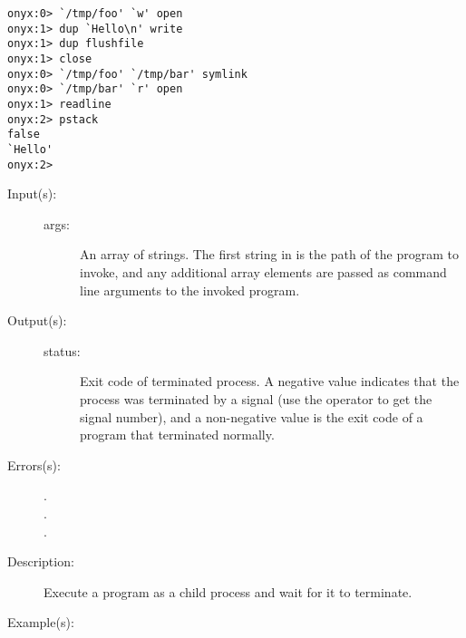 \begin{description}
\begin{description}
\begin{verbatim}
onyx:0> `/tmp/foo' `w' open
onyx:1> dup `Hello\n' write
onyx:1> dup flushfile
onyx:1> close
onyx:0> `/tmp/foo' `/tmp/bar' symlink
onyx:0> `/tmp/bar' `r' open
onyx:1> readline
onyx:2> pstack
false
`Hello'
onyx:2>
		\end{verbatim}
	\end{description}
\label{systemdict:system}
\item[{\onyxop{args}{system}{status}}: ]
	\begin{description}\item[]
	\item[Input(s): ]
		\begin{description}\item[]
		\item[args: ]
			An array of strings.  The first string in 
			is the path of the program to invoke, and any additional
			array elements are passed as command line arguments to
			the invoked program.
		\end{description}
	\item[Output(s): ]
		\begin{description}\item[]
		\item[status: ]
			Exit code of terminated process.  A negative value
			indicates that the process was terminated by a signal
			(use the 
			operator to get the signal number), and a non-negative
			value is the exit code of a program that terminated
			normally.
		\end{description}
	\item[Errors(s): ]
		\begin{description}\item[]
		\item[.]
		\item[.]
		\item[.]
		\end{description}
	\item[Description: ]
		Execute a program as a child process and wait for it to
		terminate.
	\item[Example(s): ]\begin{verbatim}


\end{verbatim}
\end{description}
\end{description}
